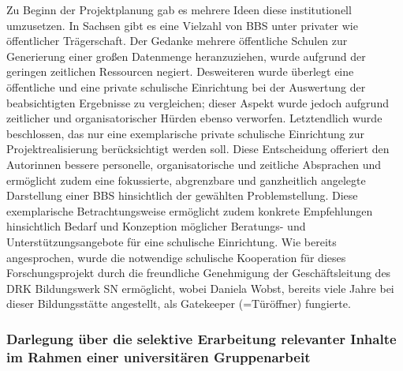 Zu Beginn der Projektplanung gab es mehrere Ideen diese institutionell umzusetzen. In Sachsen gibt es eine Vielzahl von BBS unter privater wie öffentlicher Trägerschaft. Der Gedanke mehrere öffentliche Schulen zur Generierung einer großen Datenmenge heranzuziehen, wurde aufgrund der geringen zeitlichen Ressourcen negiert. Desweiteren wurde überlegt eine öffentliche und eine private schulische Einrichtung bei der Auswertung der beabsichtigten Ergebnisse zu vergleichen; dieser Aspekt wurde jedoch aufgrund zeitlicher und organisatorischer Hürden ebenso verworfen. Letztendlich wurde beschlossen, das nur eine exemplarische private schulische Einrichtung zur Projektrealisierung berücksichtigt werden soll. Diese Entscheidung offeriert den Autorinnen bessere personelle, organisatorische und zeitliche Absprachen und ermöglicht zudem eine fokussierte, abgrenzbare und ganzheitlich angelegte Darstellung einer BBS hinsichtlich der gewählten Problemstellung. Diese exemplarische  Betrachtungsweise ermöglicht zudem konkrete Empfehlungen hinsichtlich Bedarf und Konzeption möglicher Beratungs- und Unterstützungsangebote für eine schulische Einrichtung.
Wie bereits angesprochen, wurde die notwendige schulische Kooperation für dieses Forschungsprojekt durch die freundliche Genehmigung der Geschäftsleitung des DRK Bildungswerk SN ermöglicht, wobei Daniela Wobst, bereits viele Jahre bei dieser Bildungsstätte angestellt, als Gatekeeper (=Türöffner) fungierte. 

\subsubsection[Selektive Erarbeitung im Rahmen einer universitären Gruppenarbeit]{Darlegung über die selektive Erarbeitung relevanter Inhalte im Rahmen einer universitären Gruppenarbeit}
\label{sec:DarlegungÜberDieSelektiveErarbeitungRelevanterInhalteImRahmenEinerUniversitärenSeminararbeit}

